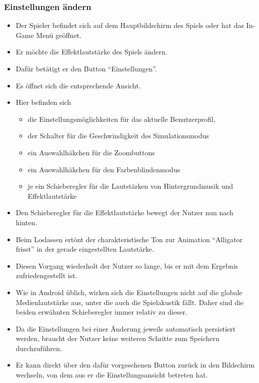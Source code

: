 \subsubsection{Einstellungen ändern}
\begin{itemize}
\item Der Spieler befindet sich auf dem Hauptbildschirm des Spiels oder hat das In-Game Menü 
geöffnet.
\item Er möchte die Effektlautstärke des Spiels ändern.
\item Dafür betätigt er den Button "`Einstellungen"'.
\item Es öffnet sich die entsprechende Ansicht.
\item Hier befinden sich
	\begin{itemize}
	\item die Einstellungsmöglichkeiten für das aktuelle Benutzerprofil, 
	\item der Schalter für die Geschwindigkeit des Simulationsmodus
	\item ein Auswahlhäkchen für die Zoombuttons
	\item ein Auswahlhäkchen für den Farbenblindenmodus
	\item je ein Schieberegler für die Lautstärken von Hintergrundmusik und Effektlautstärke
	\end{itemize}
\item Den Schieberegler für die Effektlautstärke bewegt der Nutzer nun nach hinten.
\item Beim Loslassen ertönt der charakteristische Ton zur Animation "`Alligator frisst"' in der
gerade eingestellten Lautstärke.
\item Diesen Vorgang wiederholt der Nutzer so lange, bis er mit dem Ergebnis zufriedengestellt ist.
\item Wie in Android üblich, wirken sich die Einstellungen nicht auf die globale Medienlautstärke
aus, unter die auch die Spielakustik fällt. Daher sind die beiden erwähnten Schieberegler immer relativ zu dieser. 
\item Da die Einstellungen bei einer Änderung jeweils automatisch persistiert werden, braucht der
Nutzer keine weiteren Schritte zum Speichern durchzuführen.
\item Er kann direkt über den dafür vorgesehenen Button zurück in den Bildschirm
wechseln, von dem aus er die Einstellungsansicht betreten hat.
\end{itemize}
